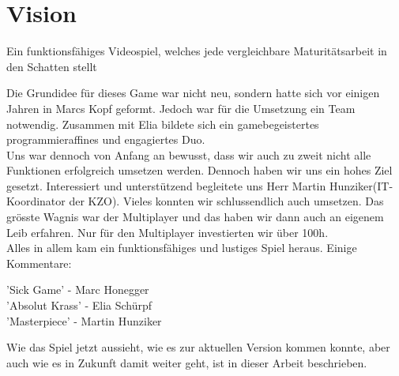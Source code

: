 \chapter{Vision}
\begin{center}
    Ein funktionsfähiges Videospiel, welches jede vergleichbare Maturitätsarbeit in den Schatten stellt\\
\end{center}
Die Grundidee für dieses Game war nicht neu, sondern hatte sich vor einigen Jahren in  Marcs Kopf geformt.
Jedoch war für die Umsetzung ein Team notwendig. Zusammen mit Elia bildete sich ein gamebegeistertes programmieraffines und engagiertes Duo.\\
Uns war dennoch von Anfang an bewusst,
dass wir auch zu zweit nicht alle Funktionen erfolgreich umsetzen werden. Dennoch haben wir uns ein hohes Ziel gesetzt. Interessiert und 
unterstützend begleitete uns Herr Martin Hunziker(IT-Koordinator der KZO).
Vieles konnten wir schlussendlich auch umsetzen.
Das grösste Wagnis war der Multiplayer und das haben wir dann auch an eigenem Leib erfahren.
Nur für den Multiplayer investierten wir über 100h.\\
Alles in allem kam ein funktionsfähiges und lustiges Spiel heraus.
Einige Kommentare:
\begin{center}
    'Sick Game' - Marc Honegger \\
    'Absolut Krass' - Elia Schürpf \\ 
    'Masterpiece' - Martin Hunziker
\end{center}
Wie das Spiel jetzt aussieht, wie es zur aktuellen Version kommen konnte, aber auch wie es in Zukunft damit weiter geht, ist in dieser Arbeit beschrieben.